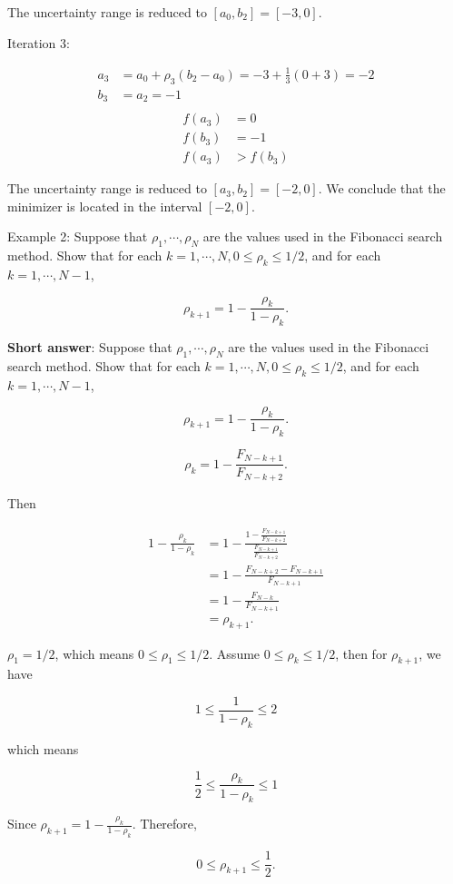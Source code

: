 The uncertainty range is reduced to \(\left[a_{0}, b_{2}\right]=[-3,0]\).

Iteration 3:

\[
\begin{aligned}
	a_{3}&=a_{0}+\rho_{3}\left(b_{2}-a_{0}\right)=-3+\frac{1}{3}(0+3)=-2 \\
	b_{3}&=a_{2}=-1 \\
\end{aligned}
\]
\[
\begin{aligned}
	f\left(a_{3}\right)&=0 \\
	 f\left(b_{3}\right)&=-1 \\
	f\left(a_{3}\right)&>f\left(b_{3}\right)
\end{aligned}
\]


The uncertainty range is reduced to \(\left[a_{3}, b_{2}\right]=[-2,0]\). We conclude that the minimizer is located in the interval \([-2,0]\).

\medskip

\noindent
Example 2: Suppose that \(\rho_{1}, \cdots, \rho_{N}\) are the values used in the Fibonacci search method. Show that for each \(k=1, \cdots, N, 0 \leq \rho_{k} \leq 1 / 2\), and for each \(k=1, \cdots, N-1\),

\[
	\rho_{k+1}=1-\frac{\rho_{k}}{1-\rho_{k}} .
\]

\textbf{Short answer}:
Suppose that \(\rho_{1}, \cdots, \rho_{N}\) are the values used in the Fibonacci search method. Show that for each \(k=1, \cdots, N, 0 \leq \rho_{k} \leq 1 / 2\), and for each \(k=1, \cdots, N-1\),

\[
	\rho_{k+1}=1-\frac{\rho_{k}}{1-\rho_{k}} .
\]

\[\rho_{k}=1-\frac{F_{N-k+1}}{F_{N-k+2}}.\] 

Then

\[
	\begin{aligned}
		1-\frac{\rho_{k}}{1-\rho_{k}} & =1-\frac{1-\frac{F_{N-k+1}}{F_{N-k+2}}}{\frac{F_{N-k+1}}{F_{N-k+2}}} \\
		& =1-\frac{F_{N-k+2}-F_{N-k+1}}{F_{N-k+1}} \\
		& =1-\frac{F_{N-k}}{F_{N-k+1}} \\
		& =\rho_{k+1} .
	\end{aligned}
\]

\(\rho_{1}=1 / 2\), which means \(0 \leq \rho_{1} \leq 1 / 2\). Assume \(0 \leq \rho_{k} \leq 1 / 2\), then for \(\rho_{k+1}\), we have

\[
	1 \leq \frac{1}{1-\rho_{k}} \leq 2
\]

which means

\[
	\frac{1}{2} \leq \frac{\rho_{k}}{1-\rho_{k}} \leq 1
\]

Since \(\rho_{k+1}=1-\frac{\rho_{k}}{1-\rho_{k}}\). Therefore,

\[
	0 \leq \rho_{k+1} \leq \frac{1}{2} .
\]
